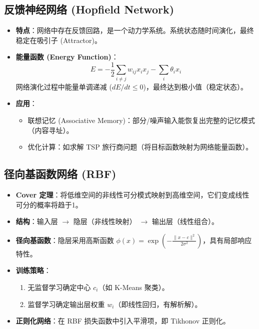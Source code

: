 \documentclass[a4paper, 11pt]{ctexart}
\begin{document}
\subsection{反馈神经网络 (Hopfield Network)}
\begin{itemize}
    \item \textbf{特点}：网络中存在反馈回路，是一个动力学系统。系统状态随时间演化，最终稳定在吸引子 (Attractor)。
    \item \textbf{能量函数 (Energy Function)}：
    $$ E = -\frac{1}{2} \sum_{i \neq j} w_{ij} x_i x_j - \sum_i \theta_i x_i $$
    网络演化过程中能量单调递减 ($dE/dt \le 0$)，最终达到极小值（稳定状态）。
    \item \textbf{应用}：
    \begin{itemize}
        \item 联想记忆 (Associative Memory)：部分/噪声输入能恢复出完整的记忆模式（内容寻址）。
        \item 优化计算：如求解 TSP 旅行商问题（将目标函数映射为网络能量函数）。
    \end{itemize}
\end{itemize}

\subsection{径向基函数网络 (RBF)}
\begin{itemize}
    \item \textbf{Cover 定理}：将低维空间的非线性可分模式映射到高维空间，它们变成线性可分的概率将趋于1。
    \item \textbf{结构}：输入层 $\to$ 隐层（非线性映射） $\to$ 输出层（线性组合）。
    \item \textbf{径向基函数}：隐层采用高斯函数 $\phi(x) = \exp(-\frac{\|x-c\|^2}{2\sigma^2})$，具有局部响应特性。
    \item \textbf{训练策略}：
    \begin{enumerate}
        \item 无监督学习确定中心 $c_i$（如 K-Means 聚类）。
        \item 监督学习确定输出层权重 $w_i$（即线性回归，有解析解）。
    \end{enumerate}
    \item \textbf{正则化网络}：在 RBF 损失函数中引入平滑项，即 Tikhonov 正则化。
\end{itemize}
\end{document}
